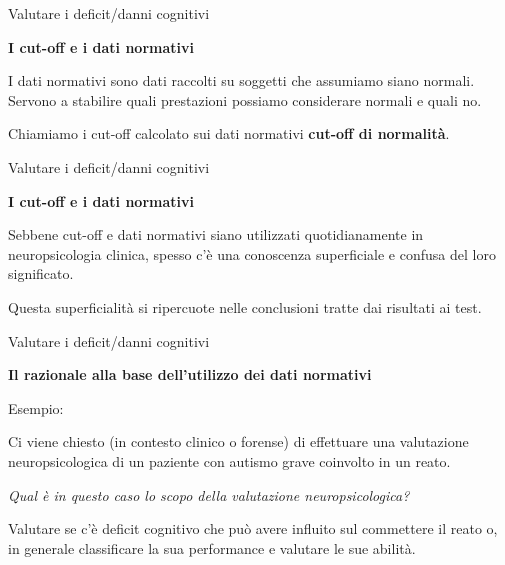 \documentclass[
  ignorenonframetext,
]{beamer}
\begin{document}
\begin{frame}{Valutare i deficit/danni cognitivi}
\label{valutare-i-deficitdanni-cognitivi-2}
\begin{center}
  \textbf{I  cut-off e i dati normativi}
\end{center}

I dati normativi sono dati raccolti su soggetti che assumiamo siano
normali. Servono a stabilire quali prestazioni possiamo considerare
normali e quali no. \vspace{2em}

Chiamiamo i cut-off calcolato sui dati normativi \textbf{cut-off di
normalità}.
\end{frame}

\begin{frame}{Valutare i deficit/danni cognitivi}
\label{valutare-i-deficitdanni-cognitivi-3}
\begin{center}
  \textbf{I  cut-off e i dati normativi}
\end{center}

Sebbene cut-off e dati normativi siano utilizzati quotidianamente in
neuropsicologia clinica, spesso c'è una conoscenza superficiale e
confusa del loro significato. \vspace{2em}

Questa superficialità si ripercuote nelle conclusioni tratte dai
risultati ai test.
\end{frame}

\begin{frame}{Valutare i deficit/danni cognitivi}
\label{valutare-i-deficitdanni-cognitivi-4}
\begin{center}
  \textbf{Il razionale alla base dell’utilizzo dei dati normativi}
\end{center}

Esempio:

Ci viene chiesto (in contesto clinico o forense) di effettuare una
valutazione neuropsicologica di un paziente con autismo grave coinvolto
in un reato.

\emph{Qual è in questo caso lo scopo della valutazione
neuropsicologica?} \pause

Valutare se c'è deficit cognitivo che può avere influito sul commettere
il reato o, in generale classificare la sua performance e valutare le
sue abilità.
\end{frame}
\end{document}
